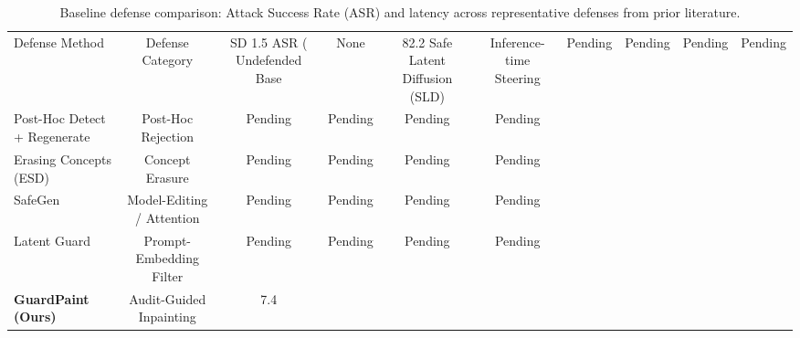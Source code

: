 \begin{table}
\caption{Baseline defense comparison: Attack Success Rate (ASR) and latency across representative defenses from prior literature.}
\label{tab:baseline_comparison}
\begin{tabular}{lccccc}
\toprule
Defense Method & Defense Category & SD 1.5 ASR (%
\midrule
Undefended Base & None & 82.2%
Safe Latent Diffusion (SLD) & Inference-time Steering & Pending & Pending & Pending & Pending \\
Post-Hoc Detect + Regenerate & Post-Hoc Rejection & Pending & Pending & Pending & Pending \\
Erasing Concepts (ESD) & Concept Erasure & Pending & Pending & Pending & Pending \\
SafeGen & Model-Editing / Attention & Pending & Pending & Pending & Pending \\
Latent Guard & Prompt-Embedding Filter & Pending & Pending & Pending & Pending \\
\textbf{GuardPaint (Ours)} & Audit-Guided Inpainting & 7.4%
\bottomrule
\end{tabular}
\end{table}
